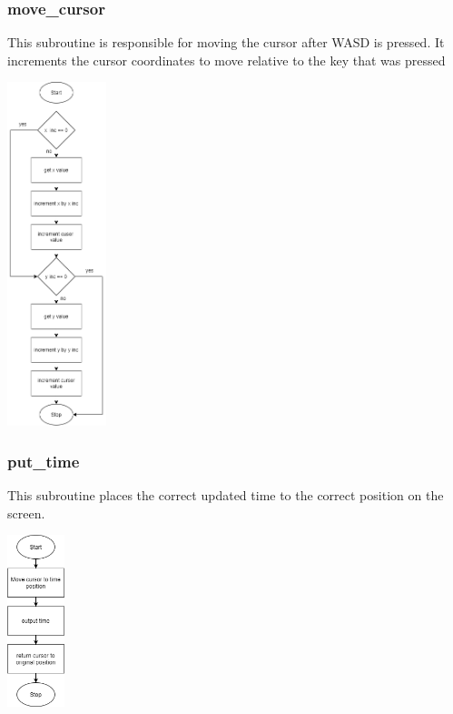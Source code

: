 \documentclass{article}
\begin{document}
    \subsubsection{move\_cursor}
        This subroutine is responsible for moving the cursor after WASD is pressed.
        It increments the cursor coordinates to move relative to the key that was
        pressed
        \begin{center}
            {\includegraphics[height=10cm]{move_cursor.png}\centering} 
        \end{center}
    
    \subsubsection{put\_time}
        This subroutine places the correct updated time to the correct
        position on the screen.
        \begin{center}
            {\includegraphics[height=5cm]{put_time.png}\centering} 
        \end{center}
        \newpage
\end{document}
